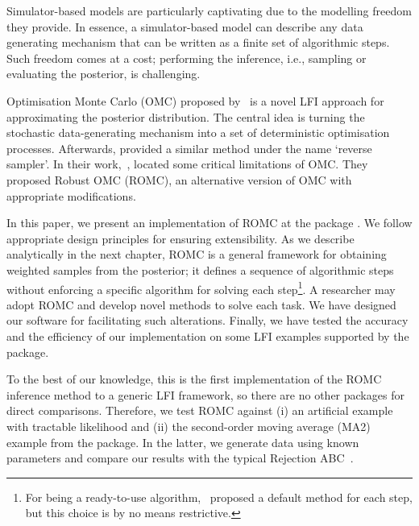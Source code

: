 Simulator-based models are particularly captivating due to the
modelling freedom they provide. In essence, a simulator-based model
can describe any data generating mechanism that can be written as a
finite set of algorithmic steps. Such freedom comes at a cost;
performing the inference, i.e., sampling or evaluating the posterior,
is challenging.

Optimisation Monte Carlo (OMC) proposed by~\citet{Meeds2015} is a
novel LFI approach for approximating the posterior distribution. The
central idea is turning the stochastic data-generating mechanism into
a set of deterministic optimisation processes. Afterwards,
\citet{Forneron2016} provided a similar method under the name `reverse
sampler'. In their work,~\citet{Ikonomov2019}, located some critical
limitations of OMC. They proposed Robust OMC (ROMC), an alternative
version of OMC with appropriate modifications.

In this paper, we present an implementation of ROMC at the
 package . We follow appropriate design principles for ensuring
extensibility. As we describe analytically in the next chapter, ROMC
is a general framework for obtaining weighted samples from the
posterior; it defines a sequence of algorithmic steps without
enforcing a specific algorithm for solving each step\footnote{For
being a ready-to-use algorithm,~\citet{Ikonomov2019} proposed a
default method for each step, but this choice is by no means
restrictive.}. A researcher may adopt ROMC and develop novel methods
to solve each task. We have designed our software for facilitating
such alterations. Finally, we have tested the accuracy and the
efficiency of our implementation on some LFI examples supported by the
 package.

To the best of our knowledge, this is the first implementation of the
ROMC inference method to a generic LFI framework, so there are no
other packages for direct comparisons. Therefore, we test ROMC against
(i) an artificial example with tractable likelihood and (ii) the
second-order moving average (MA2) example from the 
package. In the latter, we generate data using known parameters and
compare our results with the typical Rejection
ABC~\citet{lintusaari2017}.